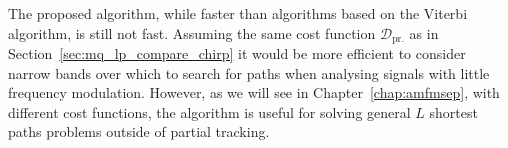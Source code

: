 The proposed algorithm, while faster than algorithms based on the Viterbi
algorithm, is still not fast. Assuming the same cost function
$\mathcal{D}_{\text{pr.}}$ as in Section~\ref{sec:mq_lp_compare_chirp} it would
be more efficient to consider narrow bands over which to search for paths when
analysing signals with little frequency modulation. However, as we will see in
Chapter~\ref{chap:amfmsep}, with different cost functions, the algorithm is
useful for solving general $L$ shortest paths problems outside of partial
tracking. 




